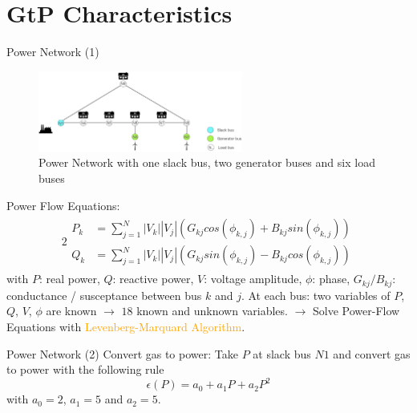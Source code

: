 \documentclass[8pt]{beamer}
\newcommand\Fontli{\fontsize{7}{7.2}\selectfont}
\begin{document}
\section{GtP Characteristics}
\begin{frame}{Power Network (1)}
\Fontli
\begin{figure}[l]
\centering
\includegraphics[width=0.6\textwidth]{images/PowerNetwork}
\caption{Power Network with one slack bus, two generator buses and six load buses}
\label{PG}
\end{figure}
\textcolor{bluepurp}{Power Flow Equations:}
\begin{alignat}{2}
\begin{split}
P_k &= \sum_{j=1}^N |V_k| |V_j| (G_{kj}cos(\phi_{k,j})+B_{kj}sin(\phi_{k,j})) \\
Q_k &= \sum_{j=1}^N |V_k| |V_j| (G_{kj}sin(\phi_{k,j})-B_{kj}cos(\phi_{k,j}))
\end{split}
\label{eq:3.5}
\end{alignat}
with $P$: real power, $Q$: reactive power, $V$: voltage amplitude, $\phi$: phase, $G_{kj}/ B_{kj}$: conductance / susceptance between bus $k$ and $j$. \newline
At each bus: two variables of $P$, $Q$, $V$, $\phi$ are known $\rightarrow$ $18$ known and unknown variables.  \newline
$\rightarrow$  Solve Power-Flow Equations with \textcolor{orange}{Levenberg-Marquard Algorithm}.
\end{frame}
\begin{frame}{Power Network (2)}
\textcolor{bluepurp}{Convert gas to power:}
Take $P$ at slack bus $N1$ and convert gas to power with the following rule
\begin{equation}
\epsilon(P) = a_0 + a_1 P + a_2 P^2
\end{equation}
with $a_0 = 2$, $a_1=5$ and $a_2=5$.
\end{frame}
\end{document}
